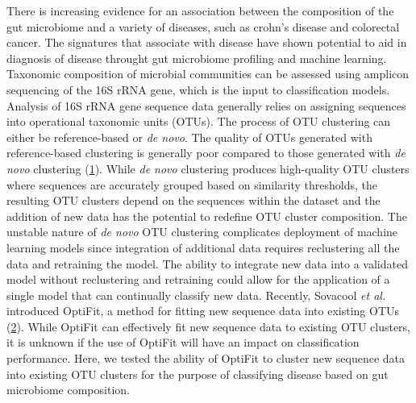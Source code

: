 \documentclass[
]{article}
\begin{document}
\newpage

There is increasing evidence for an association between the composition
of the gut microbiome and a variety of diseases, such as crohn's disease
and colorectal cancer. The signatures that associate with disease have
shown potential to aid in diagnosis of disease throught gut microbiome
profiling and machine learning. Taxonomic composition of microbial
communities can be assessed using amplicon sequencing of the 16S rRNA
gene, which is the input to classification models. Analysis of 16S rRNA
gene sequence data generally relies on assigning sequences into
operational taxonomic units (OTUs). The process of OTU clustering can
either be reference-based or \emph{de novo}. The quality of OTUs
generated with reference-based clustering is generally poor compared to
those generated with \emph{de novo} clustering
(\protect\hyperlink{ref-westcott2015}{1}). While \emph{de novo}
clustering produces high-quality OTU clusters where sequences are
accurately grouped based on similarity thresholds, the resulting OTU
clusters depend on the sequences within the dataset and the addition of
new data has the potential to redefine OTU cluster composition. The
unstable nature of \emph{de novo} OTU clustering complicates deployment
of machine learning models since integration of additional data requires
reclustering all the data and retraining the model. The ability to
integrate new data into a validated model without reclustering and
retraining could allow for the application of a single model that can
continually classify new data. Recently, Sovacool \emph{et al.}
introduced OptiFit, a method for fitting new sequence data into existing
OTUs (\protect\hyperlink{ref-sovacool2022}{2}). While OptiFit can
effectively fit new sequence data to existing OTU clusters, it is
unknown if the use of OptiFit will have an impact on classification
performance. Here, we tested the ability of OptiFit to cluster new
sequence data into existing OTU clusters for the purpose of classifying
disease based on gut microbiome composition.
\end{document}
